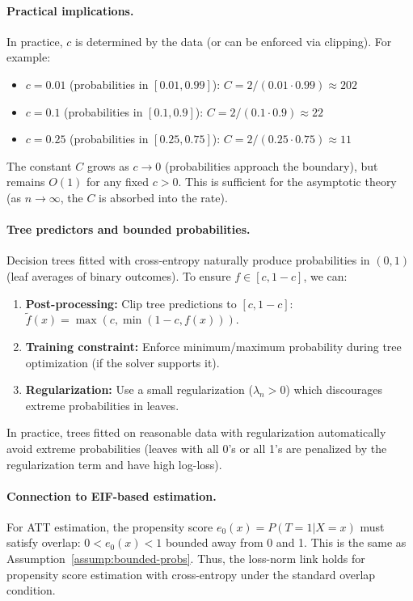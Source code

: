 \paragraph{Practical implications.}
In practice, $c$ is determined by the data (or can be enforced via clipping). For example:
\begin{itemize}
\item $c = 0.01$ (probabilities in $[0.01, 0.99]$): $C = 2/(0.01 \cdot 0.99) \approx 202$
\item $c = 0.1$ (probabilities in $[0.1, 0.9]$): $C = 2/(0.1 \cdot 0.9) \approx 22$
\item $c = 0.25$ (probabilities in $[0.25, 0.75]$): $C = 2/(0.25 \cdot 0.75) \approx 11$
\end{itemize}

The constant $C$ grows as $c \to 0$ (probabilities approach the boundary), but remains $O(1)$ for any fixed $c > 0$. This is sufficient for the asymptotic theory (as $n \to \infty$, the $C$ is absorbed into the rate).

\paragraph{Tree predictors and bounded probabilities.}
Decision trees fitted with cross-entropy naturally produce probabilities in $(0,1)$ (leaf averages of binary outcomes). To ensure $f \in [c, 1-c]$, we can:
\begin{enumerate}
\item \textbf{Post-processing:} Clip tree predictions to $[c, 1-c]$: $\tilde{f}(x) = \max(c, \min(1-c, f(x)))$.
\item \textbf{Training constraint:} Enforce minimum/maximum probability during tree optimization (if the solver supports it).
\item \textbf{Regularization:} Use a small regularization ($\lambda_n > 0$) which discourages extreme probabilities in leaves.
\end{enumerate}

In practice, trees fitted on reasonable data with regularization automatically avoid extreme probabilities (leaves with all 0's or all 1's are penalized by the regularization term and have high log-loss).

\paragraph{Connection to EIF-based estimation.}
For ATT estimation, the propensity score $e_0(x) = P(T=1|X=x)$ must satisfy overlap: $0 < e_0(x) < 1$ bounded away from 0 and 1. This is the same as Assumption~\ref{assump:bounded-probs}. Thus, the loss-norm link holds for propensity score estimation with cross-entropy under the standard overlap condition.

